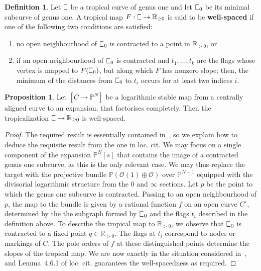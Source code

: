 \documentclass[11pt]{amsart}
\newcommand{\plC}{\scalebox{0.8}[1.3]{$\sqsubset$}}
\renewcommand{\to}{\rightarrow}
\theoremstyle{definition}
\newtheorem{prop}[thm]{Proposition}
\theoremstyle{definition}
\newtheorem{definition}[thm]{Definition}
\begin{document}
\begin{definition}
Let $\plC$ be a tropical curve of genus one and let $\plC_0$ be its minimal subcurve of genus one. A tropical map $F: \plC\to \mathbb R_{\geq 0}$ is said to be \textbf{well-spaced} if one of the following two conditions are satisfied:
\begin{enumerate}
    \item no open neighbourhood of $\plC_0$ is contracted to a point in $\mathbb R_{>0}$, or
    \item if an open neighbourhood of $\plC_0$ is contracted and $t_1,\ldots,t_k$ are the flags whose vertex is mapped to $F(\plC_0)$, but along which $F$ has nonzero slope; then, the minimum of the distances from $\plC_0$ to $t_i$ occurs for at least two indices $i$.
\end{enumerate}
\end{definition}

\begin{prop}\label{prop: well-spaced}
Let $[C\to \mathbb P^N]$ be a logarithmic stable map from a centrally aligned curve to an expansion, that factorises completely. Then the tropicalization $\plC\to \mathbb R_{\geq 0}$ is well-spaced.
\end{prop}

\begin{proof}
The required result is essentially contained in~\cite[Section 4]{RSPW2}, so we explain how to deduce the requisite result from the one in loc. cit. We may focus on a single component of the expansion $\mathbb P^N[s]$ that contains the image of a contracted genus one subcurve, as this is the only relevant case. We may thus replace the target with the projective bundle $\mathbb P(\mathcal O(1)\oplus \mathcal O)$ over $\mathbb P^{N-1}$ equipped with the divisorial logarithmic structure from the $0$ and $\infty$ sections. Let $p$ be the point to which the genus one subcurve is contracted. Passing to an open neighbourhood of $p$, the map to the bundle is given by a rational function $f$ on an open curve $C^\circ$, determined by the the subgraph formed by $\plC_0$ and the flags $t_i$ described in the definition above. To describe the tropical map to $\mathbb R_{>0}$, we observe that $\plC_0$ is contracted to a fixed point $q\in\mathbb R_{>0}$. The flags at $t_i$ correspond to nodes or markings of $C$. The pole orders of $f$ at these distinguished points determine the slopes of the tropical map. We are now exactly in the situation considered in~\cite[Second Paragraph of \S~4.6]{RSPW2}, and Lemma~4.6.1 of loc. cit. guarantees the well-spacedness as required.
\end{proof}
\end{document}
